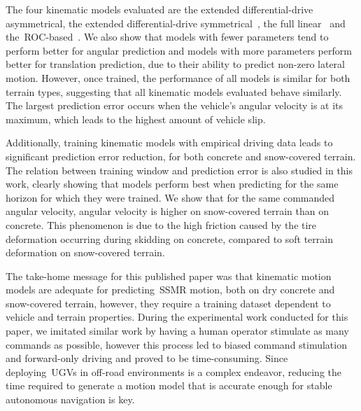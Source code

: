 \documentclass[12pt,letterpaper,oneside]{article}
\begin{document}
The four kinematic models evaluated are the extended differential-drive asymmetrical, the extended differential-drive symmetrical~\citep{Mandow2007}, the full linear~\citep{Anousaki2004} and the~\ac{ROC}-based~\citep{Wang2015}.
We also show that models with fewer parameters tend to perform better for angular prediction and models with more parameters perform better for translation prediction, due to their ability to predict non-zero lateral motion.
However, once trained, the performance of all models is similar for both terrain types, suggesting that all kinematic models evaluated behave similarly.
The largest prediction error occurs when the vehicle's angular velocity is at its maximum, which leads to the highest amount of vehicle slip.

Additionally, training kinematic models with empirical driving data leads to significant prediction error reduction, for both concrete and snow-covered terrain.
The relation between training window and prediction error is also studied in this work, clearly showing that models perform best when predicting for the same horizon for which they were trained.
We show that for the same commanded angular velocity, angular velocity is higher on snow-covered terrain than on concrete. 
This phenomenon is due to the high friction caused by the tire deformation occurring during skidding on concrete, compared to soft terrain deformation on snow-covered terrain.

The take-home message for this published paper was that kinematic motion models are adequate for predicting~\ac{SSMR} motion, both on dry concrete and snow-covered terrain, however, they require a training dataset dependent to vehicle and terrain properties.
During the experimental work conducted for this paper, we imitated similar work by having a human operator stimulate as many commands as possible, however this process led to biased command stimulation and forward-only driving and proved to be time-consuming.
Since deploying~\acp{UGV} in off-road environments is a complex endeavor, reducing the time required to generate a motion model that is accurate enough for stable autonomous navigation is key.

\begin{center}
	\textbf{}
\end{center}
\end{document}
